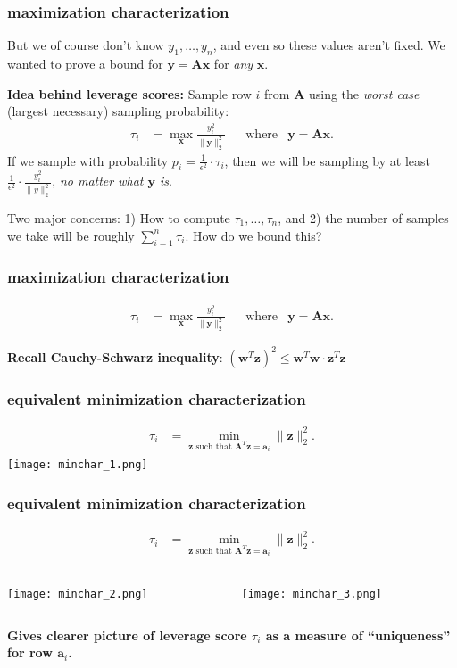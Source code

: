 \documentclass[compress]{beamer}
\newcommand{\bv}[1]{\mathbf{#1}}
\begin{document}
\begin{frame}[t]
	\frametitle{maximization characterization}	
	But we of course don't know $y_1, \ldots, y_n$, and even so these values aren't fixed. We wanted to prove a bound for $\bv{y} = \bv{A}\bv{x}$ for \emph{any} $\bv{x}$. 
	
	\textbf{Idea behind leverage scores:} Sample row $i$ from $\bv{A}$ using the \emph{worst case} (largest necessary) sampling probability:
	\begin{align*}
		\tau_i &= \max_{\bv{x}} \frac{y_i^2}{\|\bv{y}\|_2^2} &&\text{where} & \bv{y} = \bv{A}\bv{x}. 
	\end{align*}
If we sample with probability $p_i = \frac{1}{\epsilon^2}\cdot \tau_i$, then we will be sampling by at least $\frac{1}{\epsilon^2}\cdot\frac{y_i^2}{\|y\|_2^2}$, \emph{no matter what $\bv{y}$ is}. 

Two major concerns: 1) How to compute $\tau_1, \ldots, \tau_n$, and 2) the number of samples we take will be roughly $\sum_{i=1}^n \tau_i$. How do we bound this?
\end{frame}	


\begin{frame}[t]
	\frametitle{maximization characterization}
	\begin{align*}
		\tau_i &= \max_{\bv{x}} \frac{y_i^2}{\|\bv{y}\|_2^2} &&\text{where} & \bv{y} = \bv{A}\bv{x}. 
	\end{align*}
	\vspace{9em}
	
	\textbf{Recall Cauchy-Schwarz inequality}: $(\bv{w}^T\bv{z})^2 \leq \bv{w}^T\bv{w}\cdot \bv{z}^T\bv{z}$
\end{frame}

\begin{frame}[t]
	\frametitle{equivalent minimization characterization}
	\begin{align*}
		\tau_i &= \min_{\bv{z} \text{ such that } \bv{A}^T\bv{z} = \bv{a}_i} \|\bv{z}\|_2^2. 
	\end{align*}
\texttt{[image: minchar\_1.png]}
\end{frame}

\begin{frame}[t]
	\frametitle{equivalent minimization characterization}
	\begin{align*}
		\tau_i &= \min_{\bv{z} \text{ such that } \bv{A}^T\bv{z} = \bv{a}_i} \|\bv{z}\|_2^2. 
	\end{align*}
	\begin{columns}
		\begin{column}{.5\textwidth}
			\centering
			\texttt{[image: minchar\_2.png]}
		\end{column}
		\begin{column}{.5\textwidth}
						\centering
			\texttt{[image: minchar\_3.png]}
		\end{column}
	\end{columns}
\begin{center}
	\textbf{\alert{Gives clearer picture of leverage score $\tau_i$ as a measure of ``uniqueness'' for row $\bv{a}_i$.}}
\end{center}
\end{frame}
\end{document}
